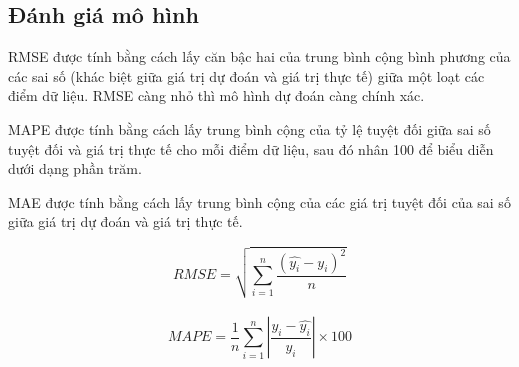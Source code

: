 \documentclass[conference]{IEEEtran}
\begin{document}
\subsection{Đánh giá mô hình}
RMSE được tính bằng cách lấy căn bậc hai của trung bình cộng bình phương của các sai số (khác biệt giữa giá trị dự đoán và giá trị thực tế) giữa một loạt các điểm dữ liệu. RMSE càng nhỏ thì mô hình dự đoán càng chính xác.

MAPE được tính bằng cách lấy trung bình cộng của tỷ lệ tuyệt đối giữa sai số tuyệt đối và giá trị thực tế cho mỗi điểm dữ liệu, sau đó nhân 100 để biểu diễn dưới dạng phần trăm.

MAE được tính bằng cách lấy trung bình cộng của các giá trị tuyệt đối của sai số giữa giá trị dự đoán và giá trị thực tế.

\[RMSE=\sqrt{\sum_{i=1}^{n} \frac{(\hat{y_i}-y_i )^2}{n} }\]\\

\[MAPE = \frac{1}{n} \sum_{i=1}^{n} \left| \frac{y_i - \hat{y_i}}{y_i} \right| \times 100\]\\
\end{document}
